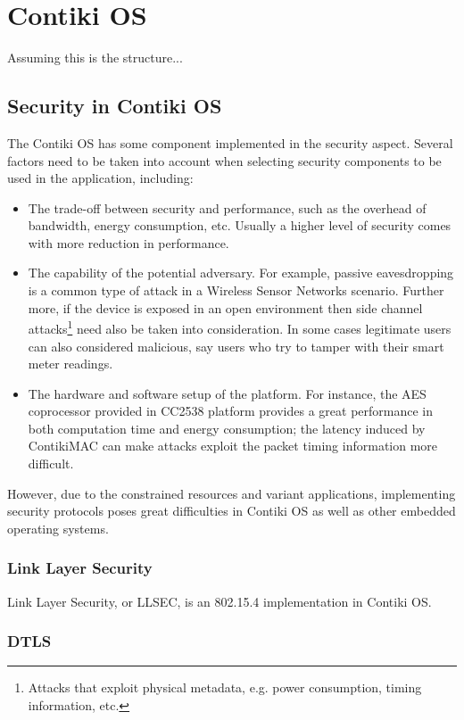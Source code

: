 \chapter{Contiki OS}
Assuming this is the structure...

\section{Security in Contiki OS}

The Contiki OS has some component implemented in the security aspect. Several factors need to be taken into account when selecting security components to be used in the application, including:

\begin{itemize}
\item The trade-off between security and performance, such as the overhead of bandwidth, energy consumption, etc. Usually a higher level of security comes with more reduction in performance.

\item The capability of the potential adversary. For example, passive eavesdropping is a common type of attack in a Wireless Sensor Networks scenario. Further more, if the device is exposed in an open environment then side channel attacks\footnote{Attacks that exploit physical metadata, e.g. power consumption, timing information, etc.} need also be taken into consideration. In some cases legitimate users can also considered malicious,  say users who try to tamper with their smart meter readings.

\item The hardware and software setup of the platform. For instance, the AES coprocessor provided in CC2538 platform provides a great performance in both computation time and energy consumption; the latency induced by ContikiMAC can make attacks exploit the packet timing information more difficult.
\end{itemize}

However, due to the constrained resources and variant applications, implementing security protocols poses great difficulties in Contiki OS as well as other embedded operating systems.

\subsection{Link Layer Security}
Link Layer Security, or LLSEC, is an 802.15.4 implementation in Contiki OS.


\subsection{DTLS}
